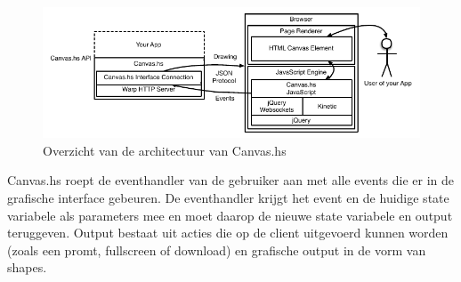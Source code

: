 \begin{figure}[H]
\begin{center}
\includegraphics[keepaspectratio,width=\textwidth]{./images/architectuur_overzicht.pdf}
\caption{Overzicht van de architectuur van Canvas.hs}
\label{fig:overzicht_architectuur}
\end{center}
\end{figure}

Canvas.hs roept de eventhandler van de gebruiker aan met alle events die er in de grafische interface gebeuren. De eventhandler krijgt het event en de huidige state variabele als parameters mee en moet daarop de nieuwe state variabele en output teruggeven. Output bestaat uit acties die op de client uitgevoerd kunnen worden (zoals een promt, fullscreen of download) en grafische output in de vorm van shapes.
